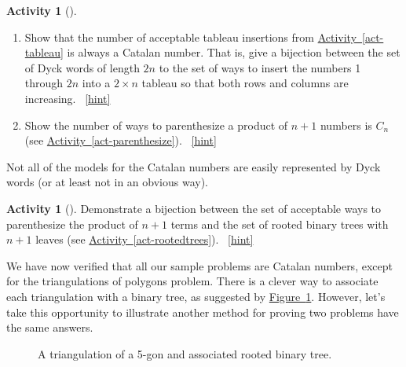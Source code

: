 \documentclass[10pt,]{book}
\theoremstyle{plain}
\theoremstyle{definition}
\theoremstyle{definition}
\theoremstyle{definition}
\newtheorem{activity}[project]{Activity}
\numberwithin{equation}{chapter}
\def\fivegon{%
    \coordinate (a) at (0,2.5);
    \coordinate (b) at (2,1.4);
    \coordinate (c) at (1,0);
    \coordinate (d) at (-.5,0);
    \coordinate (e) at (-2,1.5);
    \draw (a) -- (b) -- (c) -- (d) -- (e) -- (a);
  }
\newcommand{\vtx}[2]{node[fill,circle,inner sep=0pt, minimum size=4pt,label=#1:#2]{}}
\newcommand{\va}[1]{\vtx{above}{#1}}
\newcommand{\vr}[1]{\vtx{right}{#1}}
\newcommand{\vl}[1]{\vtx{left}{#1}}
\renewcommand{\v}{\vtx{above}{}}
\begin{document}
\begin{activity}[]\label{activity-117}
\leavevmode%
\begin{enumerate}[font=\bfseries,label=(\alph*),ref=\alph*]
\item\label{task-118} \hypertarget{p-582}{}%
Show that the number of acceptable tableau insertions from \hyperref[act-tableau]{Activity~\ref{act-tableau}} is always a Catalan number.  That is, give a bijection between the set of Dyck words of length \(2n\) to the set of ways to insert the numbers 1 through \(2n\) into a \(2\times n\) tableau so that both rows and columns are increasing.%
~\hfill{\tiny\hyperlink{a-117.a}{[hint]}\hypertarget{q-117.a}{}}\item\label{task-119} \hypertarget{p-584}{}%
Show the number of ways to parenthesize a product of \(n+1\) numbers is \(C_n\) (see \hyperref[act-parenthesize]{Activity~\ref{act-parenthesize}}).%
~\hfill{\tiny\hyperlink{a-117.b}{[hint]}\hypertarget{q-117.b}{}}\end{enumerate}
\end{activity}
\hypertarget{p-586}{}%
Not all of the models for the Catalan numbers are easily represented by Dyck words (or at least not in an obvious way).%
\begin{activity}[]\label{activity-118}
\hypertarget{p-587}{}%
Demonstrate a bijection between the set of acceptable ways to parenthesize the product of \(n+1\) terms and the set of rooted binary trees with \(n+1\) leaves (see \hyperref[act-rootedtrees]{Activity~\ref{act-rootedtrees}}).%
~\hfill{\tiny\hyperlink{a-118}{[hint]}\hypertarget{q-118}{}}\end{activity}
\hypertarget{p-589}{}%
We have now verified that all our sample problems are Catalan numbers, except for the triangulations of polygons problem.  There is a clever way to associate each triangulation with a binary tree, as suggested by \hyperref[fig-triangulationtree]{Figure~\ref{fig-triangulationtree}}.  However, let's take this opportunity to illustrate another method for proving two problems have the same answers.%
\begin{figure}
\centering
\begin{sidebyside}{2}{0.125}{0.125}{0.25}
\begin{sbspanel}{0.25}
\end{sbspanel}
\begin{sbspanel}{0.25}
\end{sbspanel}
\end{sidebyside}
\caption{A triangulation of a 5-gon and associated rooted binary tree.\label{fig-triangulationtree}}
\end{figure}
\end{document}
